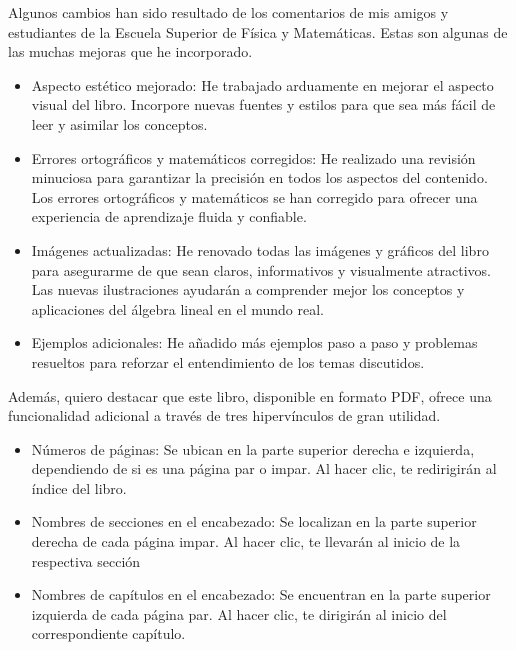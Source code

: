 Algunos cambios han sido resultado de los comentarios de mis amigos y estudiantes de la Escuela Superior de Física y Matemáticas. Estas son algunas de las muchas mejoras que he incorporado.
\begin{itemize}
    \item Aspecto estético mejorado: He trabajado arduamente en mejorar el aspecto visual del libro. Incorpore nuevas fuentes y estilos para que sea más fácil de leer y asimilar los conceptos.
    \item Errores ortográficos y matemáticos corregidos: He realizado una revisión minuciosa para garantizar la precisión en todos los aspectos del contenido. Los errores ortográficos y matemáticos se han corregido para ofrecer una experiencia de aprendizaje fluida y confiable.
    \item Imágenes actualizadas: He renovado todas las imágenes y gráficos del libro para asegurarme de que sean claros, informativos y visualmente atractivos. Las nuevas ilustraciones ayudarán a comprender mejor los conceptos y aplicaciones del álgebra lineal en el mundo real.
    \item Ejemplos adicionales: He añadido más ejemplos paso a paso y problemas resueltos para reforzar el entendimiento de los temas discutidos.
\end{itemize}\newpage\noindent
Además, quiero destacar que este libro, disponible en formato PDF, ofrece una funcionalidad adicional a través de tres hipervínculos de gran utilidad.
\begin{itemize}
    \item Números de páginas: Se ubican en la parte superior derecha e izquierda, dependiendo de si es una página par o impar. Al hacer clic, te redirigirán al índice del libro.
    \item Nombres de secciones en el encabezado: Se localizan en la parte superior derecha de cada página impar. Al hacer clic, te llevarán al inicio de la respectiva sección
    \item Nombres de capítulos en el encabezado: Se encuentran en la parte superior izquierda de cada página par. Al hacer clic, te dirigirán al inicio del correspondiente capítulo.
\end{itemize}

